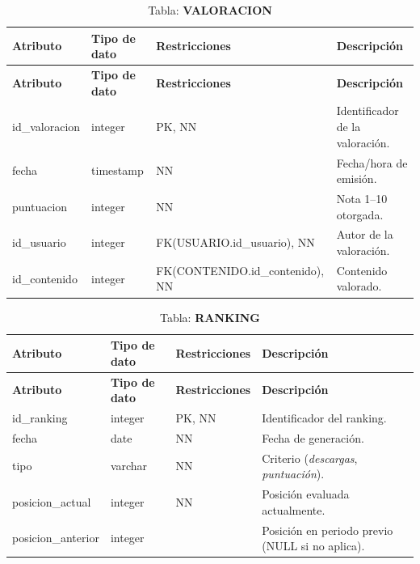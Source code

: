 \begin{longtable}{|l|l|p{5cm}|p{5cm}|}
\caption{Tabla: \textbf{VALORACION}}\\ \hline
\textbf{Atributo} & \textbf{Tipo de dato} & \textbf{Restricciones} & \textbf{Descripción} \\ \hline
\endfirsthead
\hline \textbf{Atributo} & \textbf{Tipo de dato} & \textbf{Restricciones} & \textbf{Descripción} \\ \hline
\endhead
id\_valoracion & integer   & PK, NN & Identificador de la valoración. \\ \hline
fecha          & timestamp & NN & Fecha/hora de emisión. \\ \hline
puntuacion     & integer   & NN & Nota 1–10 otorgada. \\ \hline
id\_usuario    & integer   & FK(USUARIO.id\_usuario), NN & Autor de la valoración. \\ \hline
id\_contenido  & integer   & FK(CONTENIDO.id\_contenido), NN & Contenido valorado. \\ \hline
\end{longtable}

\newpage
\begin{longtable}{|l|l|p{5cm}|p{5cm}|}
\caption{Tabla: \textbf{RANKING}}\\ \hline
\textbf{Atributo} & \textbf{Tipo de dato} & \textbf{Restricciones} & \textbf{Descripción} \\ \hline
\endfirsthead
\hline \textbf{Atributo} & \textbf{Tipo de dato} & \textbf{Restricciones} & \textbf{Descripción} \\ \hline
\endhead
id\_ranking        & integer & PK, NN & Identificador del ranking. \\ \hline
fecha              & date    & NN & Fecha de generación. \\ \hline
tipo               & varchar & NN & Criterio (\textit{descargas}, \textit{puntuación}). \\ \hline
posicion\_actual   & integer & NN & Posición evaluada actualmente. \\ \hline
posicion\_anterior & integer &     & Posición en periodo previo (NULL si no aplica). \\ \hline
\end{longtable}

